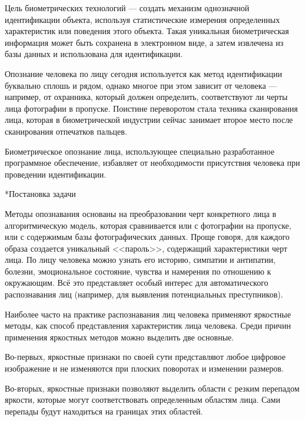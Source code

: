 \documentclass[a4paper,12pt,titlpage]{posobie}
\makeatletter
\renewcommand{\section}{\@startsection{section}{1}{0.0cm}{0.5cm}{0.1cm}%
             {\fontsize{16}{16}\bf\selectfont }}
\makeatother
\begin{document}
    Цель биометрических технологий --- создать механизм однозначной идентификации объекта, 
используя статистические измерения определенных характеристик или поведения этого объекта.
Такая уникальная биометрическая информация может быть сохранена в электронном виде, а затем 
извлечена из базы данных и использована для идентификации. 

    Опознание человека по лицу сегодня используется как метод идентификации буквально сплошь
и рядом, однако многое при этом зависит от человека --- например, от охранника, который
должен определить, соответствуют ли черты лица фотографии в пропуске. Поистине переворотом стала техника сканирования
лица, которая в биометрической индустрии сейчас занимает второе место после сканирования отпечатков пальцев.

    Биометрическое опознание лица, использующее специально разработанное программное обеспечение, 
избавляет от необходимости присутствия человека при проведении идентификации. 


\section*{Постановка задачи}

Методы опознавания основаны на преобразовании черт конкретного лица в алгоритмическую модель, которая сравнивается или
с фотографии на пропуске, или с содержимым базы фотографических данных. Проще говоря, для каждого
образа создается уникальный <<пароль>>, содержащий характеристики черт лица. По лицу человека 
можно узнать его историю, симпатии и антипатии, болезни, эмоциональное состояние, 
чувства и намерения по отношению к окружающим. Всё это представляет особый интерес для автоматического
распознавания лиц (например, для выявления потенциальных преступников).
    
    Наиболее часто на практике распознавания лиц человека применяют яркостные методы, как способ представления 
характеристик лица человека. Среди причин применения яркостных методов можно выделить две основные.

    Во-первых, яркостные признаки по своей сути представляют любое цифровое изображение и  
не изменяются при плоских поворотах и изменении размеров.
   
    Во-вторых, яркостные признаки позволяют выделить области с резким перепадом яркости, которые могут
соответствовать определенным областям лица. Сами перепады будут находиться на границах этих областей.
\end{document}
